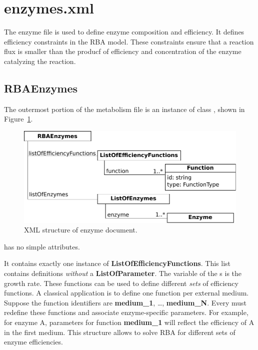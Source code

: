 
\section{enzymes.xml}

The enzyme file is used to define enzyme composition and efficiency.
It defines efficiency constraints in the RBA model.
These constraints ensure that a reaction flux is smaller than
the producf of efficiency and concentration of the enzyme catalyzing
the reaction.

\subsection{RBAEnzymes}
\label{sec:rba_enzymes}

The outermost portion of the metabolism file is an instance of class
\rbaenzymes, shown in Figure~\ref{fig:enzymes_doc}.

\begin{figure}
  \centering
  \includegraphics[scale=0.8]{figures/enzymes_doc}
  \caption{XML structure of enzyme document.}
\label{fig:enzymes_doc}
\end{figure}

\rbaenzymes{} has no simple attributes.

It contains exactly one instance of \textbf{ListOfEfficiencyFunctions}.
This list contains \function{} definitions \emph{without} a
\textbf{ListOfParameter}.
The variable of the \function{}s is the growth rate.
These functions can be used to define different
\emph{sets} of efficiency functions.
A classical application is to define one function per external medium.
Suppose the function identifiers are
\textbf{medium\_1}, \ldots, \textbf{medium\_N}.
Every \enzyme{} must redefine these functions and associate enzyme-specific
parameters.
For example, for enzyme A, parameters for function \textbf{medium\_1}
will reflect the efficiency of A in the first medium.
This structure allows to solve RBA for different sets of enzyme
efficiencies.

